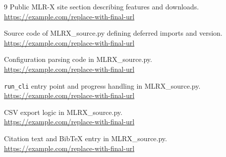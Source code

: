 \documentclass[11pt,a4paper]{article}
\begin{document}

\begin{thebibliography}{9}
 Public MLR-X site section describing features and downloads.\\
\url{https://example.com/replace-with-final-url}

 Source code of MLRX\_source.py defining deferred imports and version.\\
\url{https://example.com/replace-with-final-url}

 Configuration parsing code in MLRX\_source.py.\\
\url{https://example.com/replace-with-final-url}

 \texttt{run\_cli} entry point and progress handling in MLRX\_source.py.\\
\url{https://example.com/replace-with-final-url}

 CSV export logic in MLRX\_source.py.\\
\url{https://example.com/replace-with-final-url}

 Citation text and BibTeX entry in MLRX\_source.py.\\
\url{https://example.com/replace-with-final-url}
\end{thebibliography}
\end{document}
